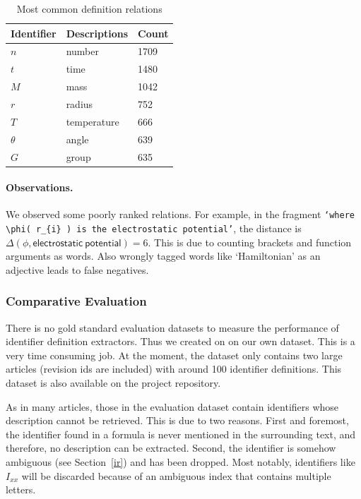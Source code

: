 \documentclass[runningheads]{llncs}
\begin{document}
\begin{table}[H]
	\begin{center}
	\begin{tabular}{| l | p{6.8cm} | l |}
		\hline
		Identifier & Descriptions & Count\\
		\hline
		$n$ & number & 1709 \\
		$t$ & time & 1480 \\
		$M$ & mass & 1042 \\
		$r$ & radius & 752 \\
		$T$ & temperature & 666 \\
		$\theta$ & angle & 639 \\
		$G$ & group & 635 \\
		\hline
	\end{tabular}
	\end{center}
\caption{\label{tcommon}Most common definition relations}
\end{table}


\paragraph{Observations.} We observed some poorly ranked relations. For
example, in the fragment \texttt{`where $\phi$( $r_{i}$ ) is the electrostatic
potential'}, the distance is %
$\Delta(\phi, \mathsf{electrostatic\:potential} ) = 6$. This is due
to counting brackets and function arguments as words. Also wrongly tagged
words like `Hamiltonian' as an adjective leads to false negatives.


\subsubsection{Comparative Evaluation}

There is no gold standard evaluation datasets to measure the performance of
identifier definition extractors. Thus we created on on our own dataset. This
is a very time consuming job. At the moment, the dataset only contains two
large articles (revision ids are included) with around 100 identifier
definitions. This dataset is also available on the project repository.


As in many articles, those in the evaluation dataset contain identifiers
whose description cannot be retrieved. This is due to two reasons. First and
foremost, the identifier found in a formula is never mentioned in the
surrounding text, and therefore, no description can be extracted. Second, the
identifier is somehow ambiguous (see Section~\ref{ir}) and has been dropped. Most
notably, identifiers like $I_{xx}$ will be discarded because of an ambiguous
index that contains multiple letters.
\end{document}
